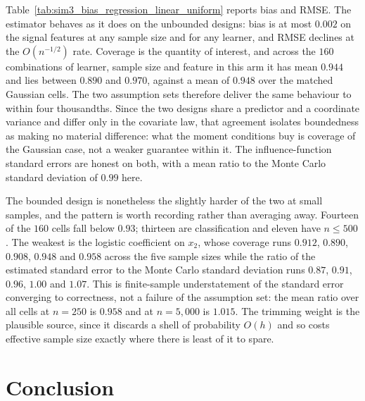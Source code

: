 \documentclass[12pt]{article}
\begin{document}
	Table~\ref{tab:sim3_bias_regression_linear_uniform} reports bias and RMSE. The estimator behaves as it does on the unbounded designs: bias is at most $0.002$ on the signal features at any sample size and for any learner, and RMSE declines at the $O(n^{-1/2})$ rate. Coverage is the quantity of interest, and across the $160$ combinations of learner, sample size and feature in this arm it has mean $0.944$ and lies between $0.890$ and $0.970$, against a mean of $0.948$ over the matched Gaussian cells. The two assumption sets therefore deliver the same behaviour to within four thousandths. Since the two designs share a predictor and a coordinate variance and differ only in the covariate law, that agreement isolates boundedness as making no material difference: what the moment conditions buy is coverage of the Gaussian case, not a weaker guarantee within it. The influence-function standard errors are honest on both, with a mean ratio to the Monte Carlo standard deviation of $0.99$ here.
	
	The bounded design is nonetheless the slightly harder of the two at small samples, and the pattern is worth recording rather than averaging away. Fourteen of the $160$ cells fall below $0.93$; thirteen are classification and eleven have $n \leq 500$. The weakest is the logistic coefficient on $x_2$, whose coverage runs $0.912$, $0.890$, $0.908$, $0.948$ and $0.958$ across the five sample sizes while the ratio of the estimated standard error to the Monte Carlo standard deviation runs $0.87$, $0.91$, $0.96$, $1.00$ and $1.07$. This is finite-sample understatement of the standard error converging to correctness, not a failure of the assumption set: the mean ratio over all cells at $n=250$ is $0.958$ and at $n=5{,}000$ is $1.015$. The trimming weight is the plausible source, since it discards a shell of probability $O(h)$ and so costs effective sample size exactly where there is least of it to spare.
	
	\section{Conclusion}
	\label{sec:conclusion}
	
\end{document}
